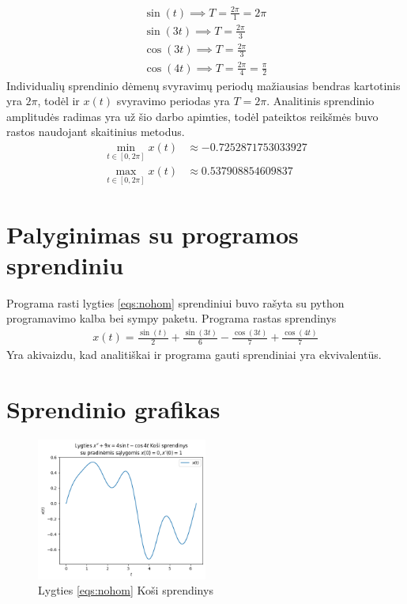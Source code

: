 \documentclass[11pt]{article}
\begin{document}
\begin{align*}
\sin(t)\implies T=\frac{2\pi}{1}=2\pi\\
\sin(3t)\implies T=\frac{2\pi}{3}\\
\cos(3t)\implies T=\frac{2\pi}{3}\\
\cos(4t)\implies T=\frac{2\pi}{4}=\frac{\pi}{2}
\end{align*}
Individualių sprendinio dėmenų svyravimų periodų mažiausias bendras kartotinis yra $2\pi$, todėl ir $x(t)$ svyravimo periodas yra $T=2\pi$. Analitinis sprendinio amplitudės radimas yra
už šio darbo apimties, todėl pateiktos reikšmės buvo rastos naudojant skaitinius metodus.
\begin{align*}
\min_{t\in[0,2\pi]}x(t)&\approx -0.7252871753033927\\
\max_{t\in[0,2\pi]}x(t)&\approx 0.537908854609837
\end{align*}
\section{Palyginimas su programos sprendiniu}
Programa rasti lygties \eqref{eqs:nohom} sprendiniui buvo rašyta su python programavimo
kalba bei sympy paketu. Programa rastas sprendinys
\begin{align}
x(t)=\frac{\sin(t)}{2}+\frac{\sin(3t)}{6}-\frac{\cos(3t)}{7}+\frac{\cos(4t)}{7}
\end{align}
Yra akivaizdu, kad analitiškai ir programa gauti sprendiniai yra ekvivalentūs.
\section{Sprendinio grafikas}
\begin{figure}[h!]
\centering
\includegraphics[width=0.5\textwidth]{graph.png}
\caption{Lygties \eqref{eqs:nohom} Koši sprendinys}
\label{fig:cauchy-sol}
\end{figure}
\end{document}

